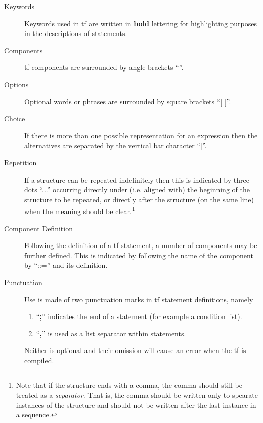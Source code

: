 \begin{description}

\item[Keywords]
Keywords used in {\sc tf} are written in {\bf bold} lettering for
highlighting purposes in the descriptions of statements.

\item[Components]
{\sc tf} components are surrounded by angle brackets ``\M{  }''.

\item[Options]
Optional words or phrases are surrounded by square brackets ``[  ]''.

\item[Choice]
If there is more than one possible representation for an expression then
the alternatives are separated by the vertical bar character ``$|$''.

\item[Repetition]
If a structure can be repeated indefinitely then this is indicated by three
dots ``...'' occurring directly under (i.e. aligned with) the beginning of
the structure to be repeated, or directly after the structure (on the same
line) when the meaning should be clear.\footnote{Note that if the structure
ends with a comma, the comma should still be treated as a {\em separator}.
That is, the comma should be written only to spearate instances of the
structure and should not be written after the last instance in a sequence.}

\item[Component Definition]
Following the definition of a {\sc tf} statement, a number of components may
be further defined.  This is indicated by following the name of the
component by ``::=''  and its definition.
\index{{\bf ::=}}

\item[Punctuation]
Use is made of two punctuation marks in {\sc tf} statement definitions, namely

\begin{enumerate}

\item ``{\bf ;}''
indicates the end of a statement (for example a condition list).

\item ``{\bf ,}''
is used as a list separator within statements.

\end{enumerate}

Neither is optional and their omission will cause an error when the
{\sc tf} is compiled.


\end{description}
